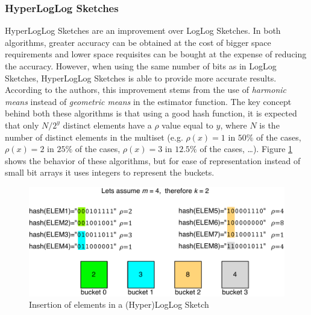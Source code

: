\subsubsection{HyperLogLog Sketches}
\label{sec:hyperloglog-sketches}
HyperLogLog Sketches \cite{Fusy:2007um} are an improvement over LogLog
Sketches. In both algorithms, greater accuracy can be obtained at the
cost of bigger space requirements and lower space requisites can be
bought at the expense of reducing the accuracy. However, when using the same
number of bits as in LogLog Sketches, HyperLogLog Sketches is able to
provide more accurate results. According to the authors, this
improvement stems from the use of \emph{harmonic means} instead of
\emph{geometric means} in the estimator function. The key concept
behind both these algorithms is that using a good hash function, it is
expected that only $N/2^y$ distinct elements have a $\rho$ value equal
to $y$, where $N$ is the number of distinct elements in the multiset
(e.g. $\rho(x)=1$ in $50\%$ of the cases, $\rho(x)=2$ in $25\%$ of the
cases, $\rho(x)=3$ in $12.5\%$ of the cases, \ldots). Figure
\ref{fig:hyperloglog_sketches} shows the behavior of these algorithms,
but for ease of representation instead of small bit arrays it uses
integers to represent the buckets.
\begin{figure}[htb]
  \centering
  \includegraphics[width=\textwidth]{images/hll_sketches.pdf}
  \caption{Insertion of elements in a (Hyper)LogLog Sketch}
  \label{fig:hyperloglog_sketches}
\end{figure}

